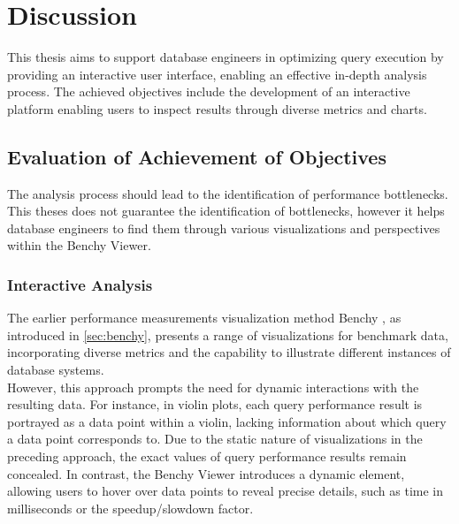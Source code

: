 
\chapter{Discussion}\label{chapter:discussion}

This thesis aims to support database engineers in optimizing query execution by providing an interactive user interface, enabling an effective in-depth analysis process. The achieved objectives include the development of an interactive platform enabling users to inspect results through diverse metrics and charts. 

\section{Evaluation of Achievement of Objectives}

The analysis process should lead to the identification of performance bottlenecks.
This theses does not guarantee the identification of bottlenecks, however it helps database engineers to find them through various visualizations and perspectives within the Benchy Viewer.


\subsection{Interactive Analysis}
The earlier performance measurements visualization method Benchy \parencite*{benchy}, as introduced in \ref*{sec:benchy},  presents a range of visualizations for benchmark data, incorporating diverse metrics and the capability to illustrate different instances of database systems.\\
However, this approach prompts the need for dynamic interactions with the resulting data. For instance, in violin plots, each query performance result is portrayed as a data point within a violin, lacking information about which query a data point corresponds to. Due to the static nature of visualizations in the preceding approach, the exact values of query performance results remain concealed. In contrast, the Benchy Viewer introduces a dynamic element, allowing users to hover over data points to reveal precise details, such as time in milliseconds or the speedup/slowdown factor.


